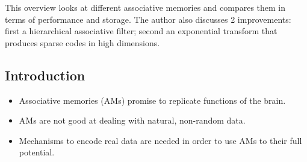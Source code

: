 \documentclass{article}
\begin{document}
This overview looks at different associative memories and compares them in terms of performance and storage. The author also discusses 2 improvements: first a hierarchical associative filter; second an exponential transform that produces sparse codes in high dimensions.
\subsection{Introduction}
\begin{itemize}
\item Associative memories (AMs) promise to replicate functions of the brain.
\item AMs are not good at dealing with natural, non-random data.
\item Mechanisms to encode real data are needed in order to use AMs to their full potential.
\end{itemize}
\end{document}
